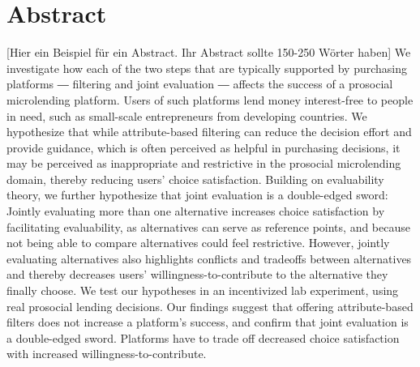 \section*{Abstract}
[Hier ein Beispiel für ein Abstract. Ihr Abstract sollte 150-250 Wörter haben] We investigate how each of the two steps that are typically supported by purchasing platforms ― filtering and joint evaluation ― affects the success of a prosocial microlending platform. Users of such platforms lend money interest-free to people in need, such as small-scale entrepreneurs from developing countries. We hypothesize that while attribute-based filtering can reduce the decision effort and provide guidance, which is often perceived as helpful in purchasing decisions, it may be perceived as inappropriate and restrictive in the prosocial microlending domain, thereby reducing users’ choice satisfaction. Building on evaluability theory, we further hypothesize that joint evaluation is a double-edged sword: Jointly evaluating more than one alternative increases choice satisfaction by facilitating evaluability, as alternatives can serve as reference points, and because not being able to compare alternatives could feel restrictive. However, jointly evaluating alternatives also highlights conflicts and tradeoffs between alternatives and thereby decreases users’ willingness-to-contribute to the alternative they finally choose. We test our hypotheses in an incentivized lab experiment, using real prosocial lending decisions. Our findings suggest that offering attribute-based filters does not increase a platform’s success, and confirm that joint evaluation is a double-edged sword. Platforms have to trade off decreased choice satisfaction with increased willingness-to-contribute.

\newpage
